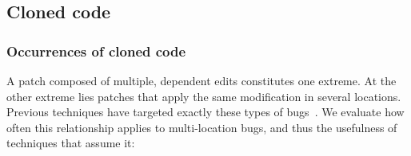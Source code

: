 \documentclass[10pt,journal,compsoc]{IEEEtran}
\begin{document}
\subsection{Cloned code}
\label{sec:clones}

\subsubsection{Occurrences of cloned code}

A patch composed of multiple, dependent edits constitutes one
extreme. At the other extreme lies patches that apply the same modification in several locations. 
Previous techniques have targeted exactly these types of
bugs~\cite{wang2018,saha2019harnessing}.  We evaluate how often this relationship applies to
multi-location bugs, and thus the usefulness of techniques that assume it:


\end{document}
